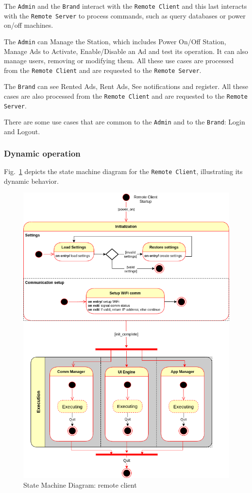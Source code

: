 The \texttt{Admin} and the \texttt{Brand} interact with the \texttt{Remote Client} and this last interacts with the \texttt{Remote Server} to process commands, such as query databases or power on/off machines.

The \texttt{Admin} can Manage the Station, which includes Power On/Off Station, Manage Ads to Activate, Enable/Disable an Ad and test its operation.
It can also manage users, removing or modifying them. All these use cases are processed from the \texttt{Remote Client} and are requested to the \texttt{Remote Server}.

The \texttt{Brand} can see Rented Ads, Rent Ads, See notifications and register. All these cases are also processed from the \texttt{Remote Client} and are requested to the \texttt{Remote Server}.

There are some use cases that are common to the  \texttt{Admin} and to the \texttt{Brand}: Login and Logout.
%
\subsubsection{Dynamic operation}
\label{sec:dyn-oper-1}

Fig.~\ref{fig:state-mach-rc} depicts the state machine diagram for the
\texttt{Remote Client}, illustrating its dynamic behavior.
%
\begin{figure}[htb!]
\centering
    \includegraphics[width=0.7\columnwidth]{./img/state-mach-rc.png}
  \caption{State Machine Diagram: remote client}%
\label{fig:state-mach-rc}
\end{figure}
%

